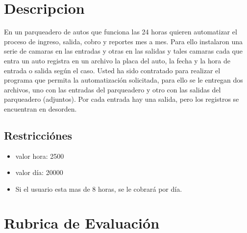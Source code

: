 \section{Descripcion}

En un parqueadero de autos que funciona las 24 horas quieren automatizar el proceso de ingreso, salida, cobro y reportes mes a mes. Para ello instalaron una serie de camaras en las entradas y otras en las salidas y tales camaras cada que entra un auto registra en un archivo la placa del auto, la fecha y la hora de entrada o salida según el caso. Usted ha sido contratado para realizar el programa que permita la automatización solicitada, para ello se le entregan dos archivos, uno con las entradas del parqueadero y otro con las salidas del parqueadero (adjuntos). Por cada entrada hay una salida, pero los registros se encuentran en desorden.

\subsection{Restricciónes}

\begin{itemize}
\item valor hora: 2500
\item valor día: 20000
\item Si el usuario esta mas de 8 horas, se le cobrará por día.
\end{itemize}

\section{Rubrica de  Evaluación}

